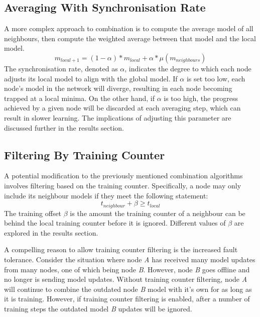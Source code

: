\subsection{Averaging With Synchronisation Rate}
A more complex approach to combination is to compute the average model of all neighbours, then compute the weighted average between that model and the local model.
\[ m_{local+1} = (1 - \alpha) * m_{local} + \alpha * \mu ( m_{neighbours} )\]
The synchronisation rate, denoted as $\alpha$, indicates the degree to which each node adjusts its local model to align with the global model. If $\alpha$ is set too low, each node's model in the network will diverge, resulting in each node becoming trapped at a local minima. On the other hand, if $\alpha$ is too high, the progress achieved by a given node will be discarded at each averaging step, which can result in slower learning. The implications of adjusting this parameter are discussed further in the results section.

\subsection{Filtering By Training Counter}
A potential modification to the previously mentioned combination algorithms involves filtering based on the training counter. Specifically, a node may only include its neighbour models if they meet the following statement:
\[t_{neighbour} + \beta \ge t_{local} \]
The training offset $\beta$ is the amount the training counter of a neighbour can be behind the local training counter before it is ignored. Different values of $\beta$ are explored in the results section.

A compelling reason to allow training counter filtering is the increased fault tolerance. Consider the situation where node \emph{A} has received many model updates from many nodes, one of which being node \emph{B}. However, node \emph{B} goes offline and no longer is sending model updates. Without training counter filtering, node \emph{A} will continue to combine the outdated node \emph{B} model with it's own for as long as it is training. However, if training counter filtering is enabled, after a number of training steps the outdated model \emph{B} updates will be ignored.

